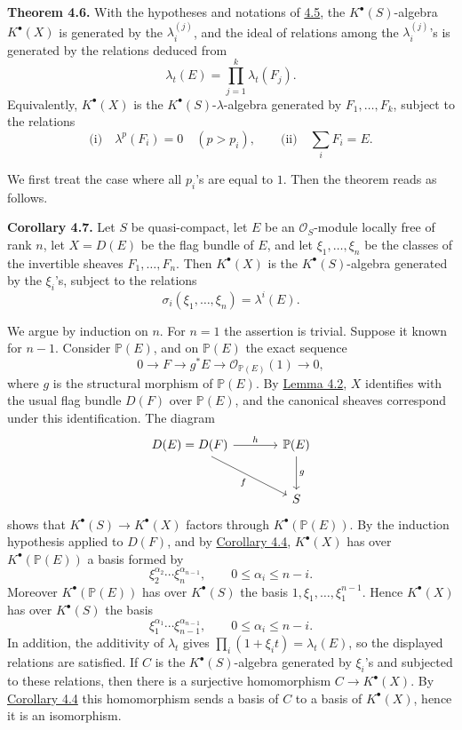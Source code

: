 \textbf{Theorem 4.6.} With the hypotheses and notations of \hyperlink{sga6.e06.sec.4.5}{4.5}, the \(K^\bullet(S)\)-algebra \(K^\bullet(X)\) is generated by the \(\lambda_i^{(j)}\), and the ideal of relations among the \(\lambda_i^{(j)}\)'s is generated by the relations deduced from
\[
  \lambda_t(E)=\prod_{j=1}^{k}\lambda_t(F_j).
\]
Equivalently, \(K^\bullet(X)\) is the \(K^\bullet(S)\)-\(\lambda\)-algebra generated by \(F_1,\ldots,F_k\), subject to the relations
\[
  \text{(i)}\quad \lambda^p(F_i)=0\quad(p>p_i),
  \qquad
  \text{(ii)}\quad \sum_i F_i=E.
\]

We first treat the case where all \(p_i\)'s are equal to \(1\). Then the theorem reads as follows.

\textbf{Corollary 4.7.} Let \(S\) be quasi-compact, let \(E\) be an \(\mathcal O_S\)-module locally free of rank \(n\), let \(X=D(E)\) be the flag bundle of \(E\), and let \(\xi_1,\ldots,\xi_n\) be the classes of the invertible sheaves \(F_1,\ldots,F_n\). Then \(K^\bullet(X)\) is the \(K^\bullet(S)\)-algebra generated by the \(\xi_i\)'s, subject to the relations
\[
  \sigma_i(\xi_1,\ldots,\xi_n)=\lambda^i(E).
\]

We argue by induction on \(n\). For \(n=1\) the assertion is trivial. Suppose it known for \(n-1\). Consider \(\mathbb P(E)\), and on \(\mathbb P(E)\) the exact sequence
\[
  0\longrightarrow F\longrightarrow g^*E\longrightarrow \mathcal O_{\mathbb P(E)}(1)\longrightarrow 0,
\]
where \(g\) is the structural morphism of \(\mathbb P(E)\). By \hyperlink{sga6.e06.lem.4-2}{Lemma 4.2}, \(X\) identifies with the usual flag bundle \(D(F)\) over \(\mathbb P(E)\), and the canonical sheaves correspond under this identification. The diagram
\[
\begin{tikzcd}[column sep=large,row sep=large]
D(E)=D(F) \arrow[r,"h"] \arrow[dr,"f"'] & \mathbb P(E) \arrow[d,"g"]\\
& S
\end{tikzcd}
\]
shows that \(K^\bullet(S)\to K^\bullet(X)\) factors through \(K^\bullet(\mathbb P(E))\). By the induction hypothesis applied to \(D(F)\), and by \hyperlink{sga6.e06.cor.4-4}{Corollary 4.4}, \(K^\bullet(X)\) has over \(K^\bullet(\mathbb P(E))\) a basis formed by
\[
  \xi_2^{\alpha_2}\cdots \xi_n^{\alpha_{n-1}},
  \qquad 0\leq \alpha_i\leq n-i.
\]
Moreover \(K^\bullet(\mathbb P(E))\) has over \(K^\bullet(S)\) the basis \(1,\xi_1,\ldots,\xi_1^{n-1}\). Hence \(K^\bullet(X)\) has over \(K^\bullet(S)\) the basis
\[
  \xi_1^{\alpha_1}\cdots \xi_{n-1}^{\alpha_{n-1}},
  \qquad 0\leq \alpha_i\leq n-i.
\]
In addition, the additivity of \(\lambda_t\) gives \(\prod_i(1+\xi_i t)=\lambda_t(E)\), so the displayed relations are satisfied. If \(C\) is the \(K^\bullet(S)\)-algebra generated by \(\xi_i\)'s and subjected to these relations, then there is a surjective homomorphism \(C\to K^\bullet(X)\). By \hyperlink{sga6.e06.cor.4-4}{Corollary 4.4} this homomorphism sends a basis of \(C\) to a basis of \(K^\bullet(X)\), hence it is an isomorphism.

